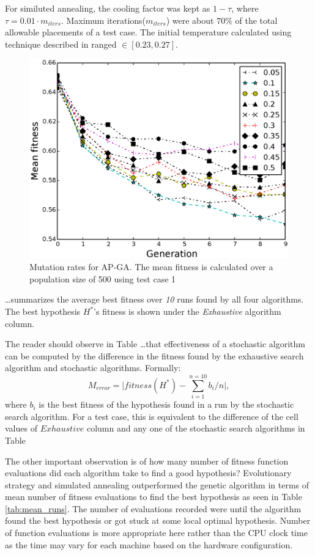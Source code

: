\documentclass{sig-alternate}
\begin{document}
For similuted annealing, the cooling factor was kept as $1 - \tau$, where $\tau = 0.01 \cdot m_{iters}$. Maximum iterations($m_{iters}$) were about $70\%$ of the total allowable placements of a test case. The initial temperature calculated using technique described in \cite{ben2004computing} ranged $\in [0.23, 0.27]$.

\begin{figure}
    \begin{center}
        \includegraphics[width=.51\textwidth]{FIG/ga_mut.eps}
\end{center}
\caption{Mutation rates for AP-GA. The mean fitness is calculated over a population size of 500 using test case 1}
\label{fig:ga_mut}
\end{figure}

\dots summarizes the average best fitness over \textit{10} runs found by all four algorithms. The best hypothesis $H^*$'s fitness is shown under the \textit{Exhaustive} algorithm column.

The reader should observe in Table \dots that effectiveness of a stochastic algorithm can be computed by the difference in the fitness found by the exhaustive search algorithm and stochastic algorithms. Formally:
\begin{equation}
    M_{error} = \mid fitness(H^*) - \sum_{i=1}^{n=10} b_i/n \mid,
\end{equation}
where $b_i$ is the best fitness of the hypothesis found in a run by the stochastic search algorithm. For a test case, this is equivalent to the difference of the cell values of  $Exhaustive$ column and any one of the stochastic search algorithms in Table

The other important observation is of how many number of fitness function evaluations did each algorithm take to find a good hypothesis? Evolutionary strategy and simulated annealing outperformed the genetic algorithm in terms of mean number of fitness evaluations to find the best hypothesis as seen in Table \ref{tab:mean_runs}. The number of evaluations recorded were until the algorithm found the best hypothesis or got stuck at some local optimal hypothesis. Number of function evaluations is more appropriate here rather than the CPU clock time as the time may vary for each machine based on the hardware configuration.
\end{document}
